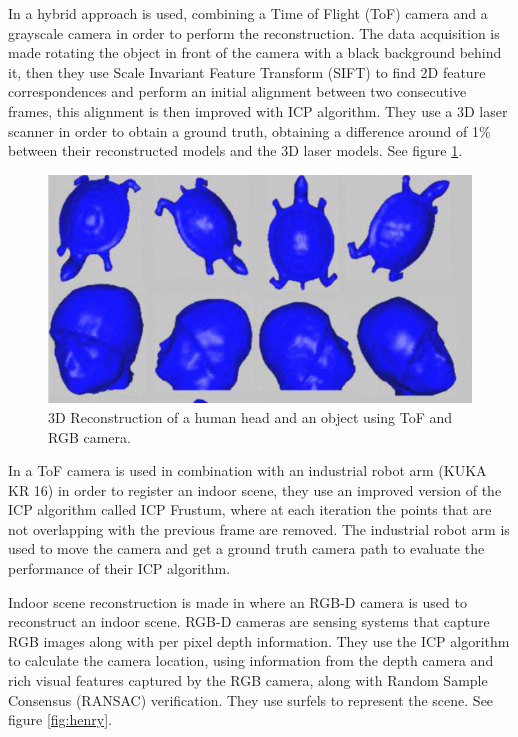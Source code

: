 In \cite{guangyu} a hybrid approach is used, combining a Time of Flight (ToF) camera and a grayscale camera in order to perform the reconstruction. 
The data acquisition is made rotating the object in front of the camera with a black background behind it, then they use 
Scale Invariant Feature Transform (SIFT) to find 2D feature correspondences and perform an initial alignment between two consecutive frames, this alignment is 
then improved with ICP algorithm. They use a 3D laser scanner in order to obtain a ground truth, obtaining a difference around of 1\% 
between their reconstructed
 models and the 3D laser models. See figure \ref{fig:guangyu}.




\begin{figure}[h!]
\begin{center}
\includegraphics[scale=0.38]{images/guangyu}
\caption{3D Reconstruction of a human head and an object using ToF and RGB camera.}
\label{fig:guangyu}
\end{center}
\end{figure}

In \cite{may2009} a ToF camera is used in combination with an industrial robot arm (KUKA KR 16) in order to register an indoor scene,
they use an improved version of the ICP algorithm called ICP Frustum, where at each iteration the points that are not overlapping with the previous frame are removed. The industrial robot arm is used to move the camera and get a ground truth camera path to evaluate the performance of their ICP algorithm. 



 Indoor scene reconstruction is made in \cite{henry} where an RGB-D camera is used to reconstruct an indoor scene. RGB-D cameras are sensing systems that capture RGB images
 along with per pixel depth information. They use the ICP algorithm to calculate the camera location, using information from 
the depth camera and  rich visual
 features captured by the RGB camera, along with Random Sample Consensus (RANSAC) verification. They use surfels \cite{pfister} to represent the scene. See figure \ref{fig:henry}.

